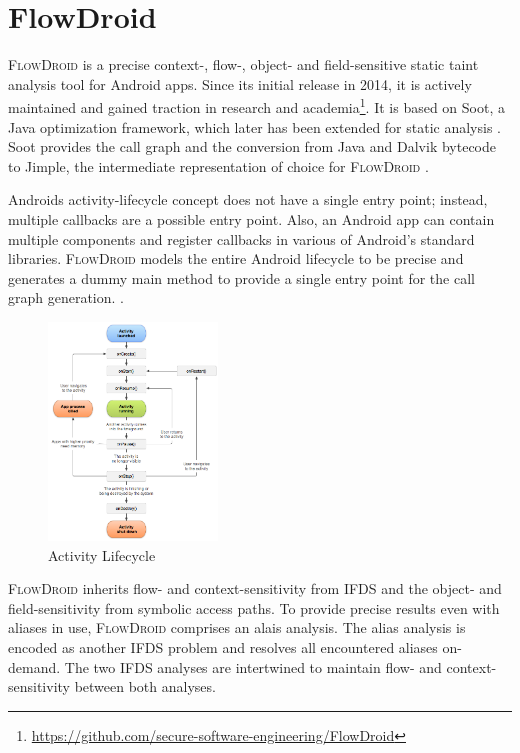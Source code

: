 \documentclass[../draft.tex]{subfiles}
\begin{document}
    \section{FlowDroid}\label{s:flowdroid}
    \textsc{FlowDroid} is a precise context-, flow-, object- and field-sensitive static taint analysis tool for Android apps\cite{Arzt2014}. 
    Since its initial release in 2014, it is actively maintained and gained traction in research and academia\footnote{\url{https://github.com/secure-software-engineering/FlowDroid}}. 
    It is based on Soot, a Java optimization framework, which later has been extended for static analysis \cite{Lam2011}. 
    Soot provides the call graph and the conversion from Java and Dalvik bytecode to Jimple, the intermediate representation of choice for \textsc{FlowDroid} \cite{Arzt2017PhD}.

    Androids activity-lifecycle concept does not have a single entry point; instead, multiple callbacks are a possible entry point. 
    Also, an Android app can contain multiple components and register callbacks in various of Android's standard libraries. 
    \textsc{FlowDroid} models the entire Android lifecycle to be precise and generates a dummy main method to provide a single entry point for the call graph generation. 
    \cite{Arzt2014}.

    \begin{figure}[ht]
        \centering
        \includegraphics[width=0.4\textwidth]{figs/activity_lifecycle.png}
        \caption{Activity Lifecycle\protect\footnotemark}
        \label{f:activity}
    \end{figure}

    \textsc{FlowDroid} inherits flow- and context-sensitivity from IFDS and the object- and field-sensitivity from symbolic access paths. To provide precise results even with aliases in use, \textsc{FlowDroid} comprises an alais analysis. The alias analysis is encoded as another IFDS problem and resolves all encountered aliases on-demand. The two IFDS analyses are intertwined to maintain flow- and context-sensitivity between both analyses\cite{Arzt2014}.
\end{document}
